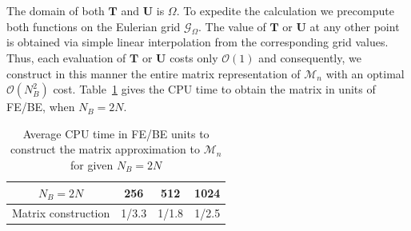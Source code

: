 \documentclass[preprint,12pt]{elsarticle}
\begin{document}
The domain of both $\mathbf{T}$ and $\mathbf{U}$ is $\Omega$. To expedite the calculation we precompute both functions on the Eulerian grid $\mathcal{G}_\Omega$. The value of $\mathbf{T}$ or $\mathbf{U}$ at any other point is obtained via simple linear
interpolation from the corresponding grid values. Thus, each evaluation of $\mathbf{T}$ or $\mathbf{U}$  costs only $\mathcal{O}(1)$  and consequently, we construct in 
this manner  the entire matrix representation of $\mathcal{M}_n$ with an optimal $\mathcal{O}(N_B^2)$ cost.
Table~\ref{Table:MConstruct} gives the CPU time to obtain the matrix in units of FE/BE, when $N_B=2N$. 
\begin{table}
\begin{center}
\begin{tabular}{|c|c c c|}
\hline
$N_B=2N$ &  256  & 512 & 1024 \\
\hline
\textrm{Matrix construction} 
& 1/3.3  & 1/1.8 &  1/2.5 \\
\hline
\end{tabular}
\end{center}
\caption{Average CPU time in FE/BE units to construct the matrix approximation to $\mathcal{M}_n$ for given $N_B=2N$}
\label{Table:MConstruct}
\end{table}
\end{document}
